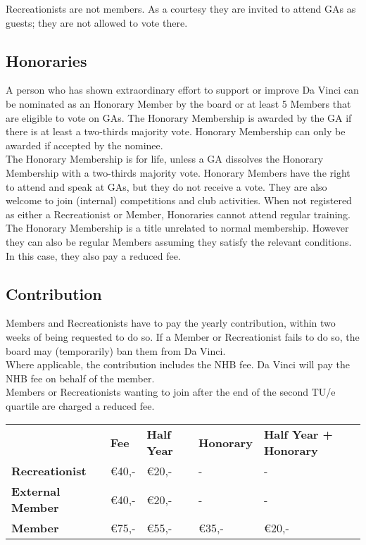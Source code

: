 \documentclass[a4paper]{article}
\begin{document}
Recreationists are not members. As a courtesy they are invited to attend GAs as guests; they are not allowed to vote there.

\subsection{Honoraries}
A person who has shown extraordinary effort to support or improve Da Vinci can be nominated as an Honorary Member by the board or at least 5 Members that are eligible to vote on GAs.
The Honorary Membership is awarded by the GA if there is at least a two-thirds majority vote. Honorary Membership can only be awarded if accepted by the nominee. \\

The Honorary Membership is for life, unless a GA dissolves the Honorary Membership with a two-thirds majority vote. Honorary Members have the right to attend and speak at GAs, but they do not receive a vote. They are also welcome to join (internal) competitions and club activities. When not registered as either a Recreationist or Member, Honoraries cannot attend regular training. \\

The Honorary Membership is a title unrelated to normal membership. However they can also be regular Members assuming they satisfy the relevant conditions. In this case, they also pay a reduced fee.

\subsection{Contribution}
Members and Recreationists have to pay the yearly contribution, within two weeks of being requested to do so. If a Member or Recreationist fails to do so, the board may (temporarily) ban them from Da Vinci. \\

Where applicable, the contribution includes the NHB fee. Da Vinci will pay the NHB fee on behalf of the member. \\

Members or Recreationists wanting to join after the end of the second TU/e quartile are charged a reduced fee. \\


\bigskip
\begin{tabular}{lllll}
                         & \textbf{Fee} & \textbf{Half Year} & \textbf{Honorary} & \textbf{Half Year + Honorary} \\
\textbf{Recreationist}   & €40,-        & €20,-              & -                 & -                             \\
\textbf{External Member} & €40,-        & €20,-              & -                 & -                             \\
\textbf{Member}          & €75,-        & €55,-              & €35,-             & €20,-                        
\end{tabular}
\end{document}
